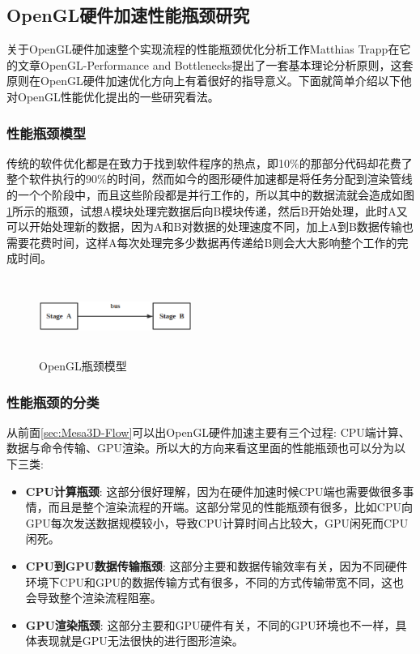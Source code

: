 \subsection{OpenGL硬件加速性能瓶颈研究}

关于OpenGL硬件加速整个实现流程的性能瓶颈优化分析工作Matthias Trapp在它的文章OpenGL-Performance and Bottlenecks\cite{OpenGL-Performance}提出了一套基本理论分析原则，这套原则在OpenGL硬件加速优化方向上有着很好的指导意义。下面就简单介绍以下他对OpenGL性能优化提出的一些研究看法。

\subsubsection{性能瓶颈模型}

传统的软件优化都是在致力于找到软件程序的热点，即10$\%$的那部分代码却花费了整个软件执行的90$\%$的时间，然而如今的图形硬件加速都是将任务分配到渲染管线的一个个阶段中，而且这些阶段都是并行工作的，所以其中的数据流就会造成如图\ref{fig:Bottleneck-Model}所示的瓶颈，试想A模块处理完数据后向B模块传递，然后B开始处理，此时A又可以开始处理新的数据，因为A和B对数据的处理速度不同，加上A到B数据传输也需要花费时间，这样A每次处理完多少数据再传递给B则会大大影响整个工作的完成时间。

\begin{figure}[H] 
  \centering
  \includegraphics[width=5cm,height=2.5cm]{figures/chap02/Bottleneck-Model}
  \caption{OpenGL瓶颈模型}
  \label{fig:Bottleneck-Model}
\end{figure}

\subsubsection{性能瓶颈的分类}

从前面\ref{sec:Mesa3D-Flow}可以出OpenGL硬件加速主要有三个过程: CPU端计算、数据与命令传输、GPU渲染。所以大的方向来看这里面的性能瓶颈也可以分为以下三类:

\begin{itemize}
\item{\textbf{CPU计算瓶颈}}: 这部分很好理解，因为在硬件加速时候CPU端也需要做很多事情，而且是整个渲染流程的开端。这部分常见的性能瓶颈有很多，比如CPU向GPU每次发送数据规模较小，导致CPU计算时间占比较大，GPU闲死而CPU闲死。
\item{\textbf{CPU到GPU数据传输瓶颈}}: 这部分主要和数据传输效率有关，因为不同硬件环境下CPU和GPU的数据传输方式有很多，不同的方式传输带宽不同，这也会导致整个渲染流程阻塞。
\item{\textbf{GPU渲染瓶颈}}: 这部分主要和GPU硬件有关，不同的GPU环境也不一样，具体表现就是GPU无法很快的进行图形渲染。
\end{itemize}

